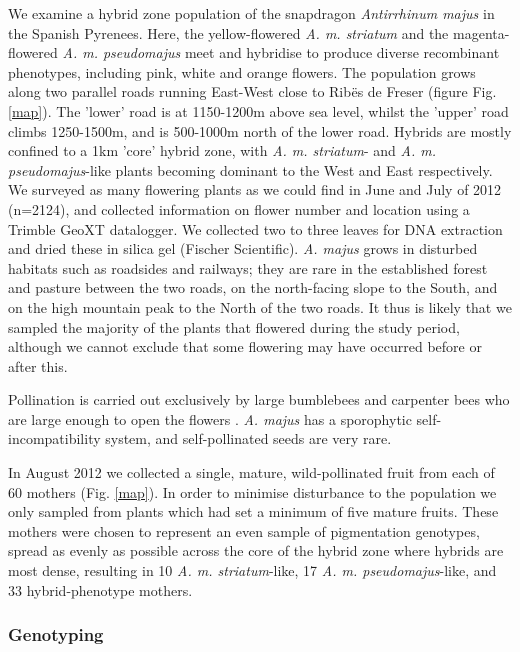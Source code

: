 \documentclass[10pt, a4paper, twocolumn]{article} %
\begin{document}
We examine a hybrid zone population of the snapdragon \textit{Antirrhinum majus} in the Spanish Pyrenees. Here, the yellow-flowered \textit{A. m. striatum} and the magenta-flowered \textit{A. m. pseudomajus} meet and hybridise to produce diverse recombinant phenotypes, including pink, white and orange flowers.
The population grows along two parallel roads running East-West close to Rib\"{e}s de Freser (figure Fig. \ref{map}). The ’lower’ road is at 1150-1200m above sea level, whilst the ’upper’ road climbs 1250-1500m, and is 500-1000m north of the lower road. Hybrids are mostly confined to a 1km ’core’ hybrid zone, with \textit{A. m. striatum}- and \textit{A. m. pseudomajus}-like plants becoming dominant to the West and East respectively. We surveyed as many flowering plants as we could find in June and July of 2012 (n=2124), and collected information on flower number and location using a Trimble GeoXT datalogger. We collected two to three leaves for DNA extraction and dried these in silica gel (Fischer Scientific). \textit{A. majus} grows in disturbed habitats such as roadsides and railways; they are rare in the established forest and pasture between the two roads, on the north-facing slope to the South, and on the high mountain peak to the North of the two roads. It thus is likely that we sampled the majority of the plants that flowered during the study period, although we cannot exclude that some flowering may have occurred before or after this. 

Pollination is carried out exclusively by large bumblebees and carpenter bees who are large enough to open the flowers \cite{vargas2010occluded, andalo2019prevalence}. \textit{A. majus} has a sporophytic self-incompatibility system, and self-pollinated seeds are very rare.

In August 2012 we collected a single, mature, wild-pollinated fruit from each of 60 mothers (Fig. \ref{map}). In order to minimise disturbance to the population we only sampled from plants which had set a minimum of five mature fruits. These mothers were chosen to represent an even sample of pigmentation genotypes, spread as evenly as possible across the core of the hybrid zone where hybrids are most dense, resulting in 10 \textit{A. m. striatum}-like, 17 \textit{A. m. pseudomajus}-like, and 33 hybrid-phenotype mothers.

\subsubsection{Genotyping}
\end{document}
